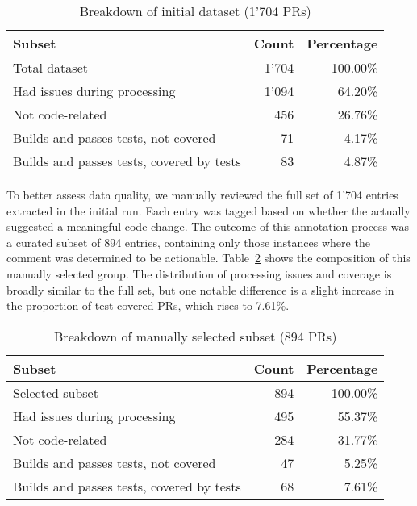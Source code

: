 \begin{table}[ht]
	\centering
	\begin{tabular}{lrr}
		\toprule
		\textbf{Subset}                           & \textbf{Count} & \textbf{Percentage} \\
		\midrule
		Total dataset                             & 1'704          & 100.00\%            \\
		Had issues during processing              & 1'094          & 64.20\%             \\
		Not code-related                          & 456            & 26.76\%             \\
		Builds and passes tests, not covered      & 71             & 4.17\%              \\
		Builds and passes tests, covered by tests & 83             & 4.87\%              \\
		\bottomrule
	\end{tabular}
	\caption{Breakdown of initial dataset (1'704 PRs)}
	\label{tab:initial-distribution}
\end{table}

To better assess data quality, we manually reviewed the full set of 1'704 entries extracted in the
initial run. Each entry was tagged based on whether the \revComment actually suggested a meaningful
code change. The outcome of this annotation process was a curated subset of 894 entries, containing
only those instances where the comment was determined to be actionable.
Table~\ref{tab:manual-selection-distribution} shows the composition of this manually selected group.
The distribution of processing issues and coverage is broadly similar to the full set, but one
notable difference is a slight increase in the proportion of test-covered PRs, which rises to
7.61\%.

\begin{table}[ht]
	\centering
	\begin{tabular}{lrr}
		\toprule
		\textbf{Subset}                           & \textbf{Count} & \textbf{Percentage} \\
		\midrule
		Selected subset                           & 894            & 100.00\%            \\
		Had issues during processing              & 495            & 55.37\%             \\
		Not code-related                          & 284            & 31.77\%             \\
		Builds and passes tests, not covered      & 47             & 5.25\%              \\
		Builds and passes tests, covered by tests & 68             & 7.61\%              \\
		\bottomrule
	\end{tabular}
	\caption{Breakdown of manually selected subset (894 PRs)}
	\label{tab:manual-selection-distribution}
\end{table}

